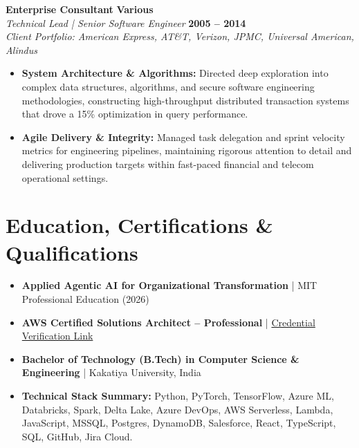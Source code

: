 \documentclass[9pt, letterpaper]{extarticle}
\begin{document}
\vfill

\textbf{Enterprise Consultant} \hfill \textbf{Various} \\
\textit{Technical Lead | Senior Software Engineer} \hfill \textbf{2005 -- 2014} \\
\small\textit{Client Portfolio: American Express, AT\&T, Verizon, JPMC, Universal American, Alindus}
\begin{itemize}
    \item \textbf{System Architecture \& Algorithms:} Directed deep exploration into complex data structures, algorithms, and secure software engineering methodologies, constructing high-throughput distributed transaction systems that drove a 15\% optimization in query performance.
    \item \textbf{Agile Delivery \& Integrity:} Managed task delegation and sprint velocity metrics for engineering pipelines, maintaining rigorous attention to detail and delivering production targets within fast-paced financial and telecom operational settings.
\end{itemize}

\vfill

\section{Education, Certifications \& Qualifications}
\begin{itemize}
    \item \textbf{Applied Agentic AI for Organizational Transformation} | MIT Professional Education (2026)
    \item \textbf{AWS Certified Solutions Architect -- Professional} | \href{https://www.credly.com/badges/7ef67d8d-67f2-4036-a8bf-8bbe73098a1f/linked_in?t=teze8g}{Credential Verification Link}
    \item \textbf{Bachelor of Technology (B.Tech) in Computer Science \& Engineering} | Kakatiya University, India
    \item \textbf{Technical Stack Summary:} Python, PyTorch, TensorFlow, Azure ML, Databricks, Spark, Delta Lake, Azure DevOps, AWS Serverless, Lambda, JavaScript, MSSQL, Postgres, DynamoDB, Salesforce, React, TypeScript, SQL, GitHub, Jira Cloud.
\end{itemize}
\end{document}

